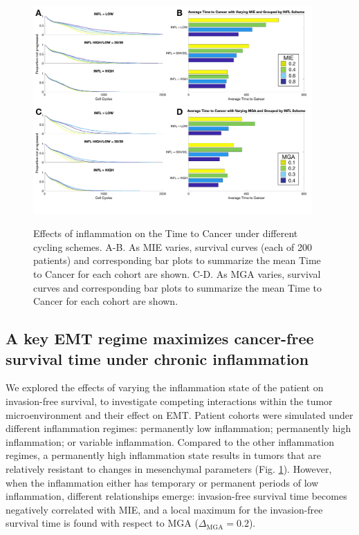 \documentclass[11pt]{article}
\begin{document}
\begin{figure}
\center
{\includegraphics[width=0.95\textwidth]{Figure4/Figure4.pdf}}
\caption{Effects of inflammation on the Time to Cancer under different cycling schemes. A-B. As MIE varies, survival curves (each of 200 patients)  and corresponding bar plots to summarize the mean Time to Cancer for each cohort are shown. C-D. As MGA varies, survival curves  and corresponding bar plots to summarize the mean Time to Cancer for each cohort are shown.}
\label{fig:VaryINFL_and_MesPars}
\end{figure}

\subsection{A key EMT regime maximizes cancer-free survival time under chronic inflammation}\label{KeyEMT}

We explored the effects of varying the inflammation state of the patient on invasion-free survival, to investigate competing interactions within the tumor microenvironment and their effect on EMT. Patient cohorts were simulated under different inflammation regimes: permanently low inflammation; permanently high inflammation; or variable inflammation. 
Compared to the other inflammation regimes, a permanently high inflammation state results in tumors that are relatively resistant to changes in mesenchymal parameters (Fig. \ref{fig:VaryINFL_and_MesPars}).
However, when the inflammation either has temporary or permanent periods of low inflammation, different relationships emerge: invasion-free survival time becomes negatively correlated with MIE, and a local maximum for the invasion-free survival time is found with respect to MGA ($\Delta_\text{MGA}= 0.2$).
\end{document}
